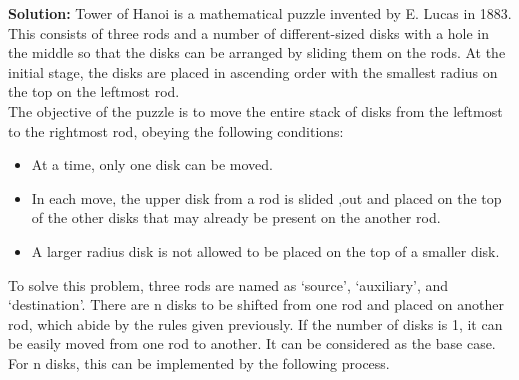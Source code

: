 \documentclass[9pt]{beamer}
\begin{document}
\begin{frame}
\small{
\textbf{Solution:} Tower of Hanoi is a mathematical puzzle invented by E. Lucas in 1883. This consists of three
rods and a number of different-sized disks with a hole in the middle so that the disks can be arranged by
sliding them on the rods. At the initial stage, the disks are placed in ascending order with the smallest
radius on the top on the leftmost rod.\\
\hspace*{0.5cm} The objective of the puzzle is to move the entire stack of disks from the leftmost to the rightmost rod,
obeying the following conditions:\\
\vspace*{0.2cm}

\begin{itemize}
  \item At a time, only one disk can be moved. \\
  \item In each move, the upper disk from a rod is slided ,out and placed on the top of the other disks that
may already be present on the another rod.\\
  \item A larger radius disk is not allowed to be placed on the top of a smaller disk.\\
\end{itemize}

\vspace*{0.2cm}
\hspace*{0.5cm} To solve this problem, three rods are named as ‘source’, ‘auxiliary’, and ‘destination’. There are n
disks to be shifted from one rod and placed on another rod, which abide by the rules given previously.
If the number of disks is 1, it can be easily moved from one rod to another. It can be considered as the
base case. For n disks, this can be implemented by the following process.\\
}
\vspace*{0.2cm}
\end{frame}
\end{document}
